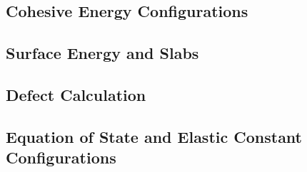 \subsection{Cohesive Energy Configurations}





\subsection{Surface Energy and Slabs}



\subsection{Defect Calculation}


\subsection{Equation of State and Elastic Constant Configurations}


